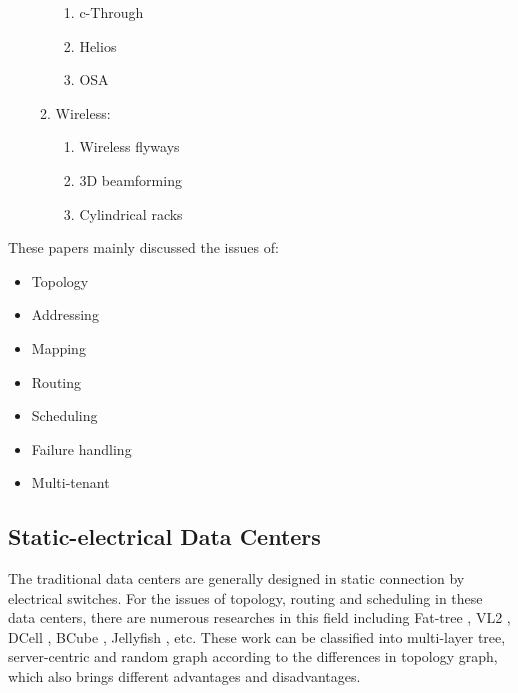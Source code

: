 \documentclass[journal,onecolumn,11pt]{IEEEtran}
\begin{document}
\begin{enumerate}
\begin{enumerate}
\begin{enumerate}
      \item c-Through \cite{Wang:2010:CPO:1851182.1851222}
      \item Helios \cite{Farrington:2010:HHE:1851182.1851223}
      \item OSA \cite{chen2012osa}
    \end{enumerate}
    \item Wireless:
    \begin{enumerate}
      \item Wireless flyways \cite{Halperin:2011:ADC:2018436.2018442}
      \item 3D beamforming \cite{Zhou:2012:MMC:2342356.2342440}
      \item Cylindrical racks \cite{Shin:2012:FCW:2396556.2396560}
    \end{enumerate}
  \end{enumerate}
\end{enumerate}

These papers mainly discussed the issues of:
\begin{itemize}
  \item Topology \cite{Al-Fares:2008:SCD:1402958.1402967,Greenberg:2009:VSF:1592568.1592576,Guo:2008:DSF:1402958.1402968,Guo:2009:BHP:1592568.1592577,singla2012jellyfish}
  \item Addressing \cite{Al-Fares:2008:SCD:1402958.1402967,Greenberg:2009:VSF:1592568.1592576}
  \item Mapping \cite{Chen:2010:GAA:1851182.1851190,Greenberg:2009:VSF:1592568.1592576}
  \item Routing \cite{Guo:2008:DSF:1402958.1402968,Guo:2009:BHP:1592568.1592577}
  \item Scheduling \cite{Al-Fares:2008:SCD:1402958.1402967,Halperin:2011:ADC:2018436.2018442}
  \item Failure handling \cite{Chen:2010:GAA:1851182.1851190,NiranjanMysore:2009:PSF:1592568.1592575,Wu:2012:NAD:2342356.2342438}
  \item Multi-tenant \cite{Mudigonda:2011:NSM:2018436.2018444,Ballani:2011:TPD:2018436.2018465,Popa:2011:FSN:2070562.2070584}
\end{itemize}

\subsection{Static-electrical Data Centers}

The traditional data centers are generally designed in static connection by electrical switches. For the issues of topology, routing and scheduling in these data centers, there are numerous researches in this field including Fat-tree \cite{Al-Fares:2008:SCD:1402958.1402967}, VL2 \cite{Greenberg:2009:VSF:1592568.1592576}, DCell \cite{Guo:2008:DSF:1402958.1402968}, BCube \cite{Guo:2009:BHP:1592568.1592577}, Jellyfish \cite{singla2012jellyfish}, etc. These work can be classified into multi-layer tree, server-centric and random graph according to the differences in topology graph, which also brings different advantages and disadvantages.
\end{document}
